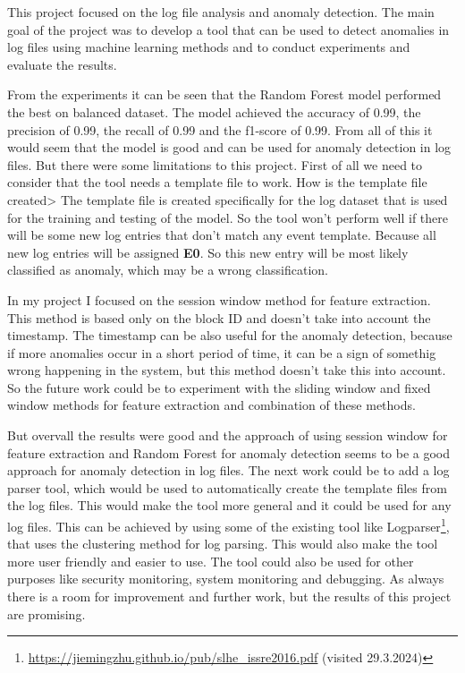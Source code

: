 This project focused on the log file analysis and anomaly detection.
The main goal of the project was to develop a tool that can be used to detect anomalies in log files using machine learning methods and to conduct experiments and evaluate the results.

From the experiments it can be seen that the Random Forest model performed the best on balanced dataset. The model achieved the accuracy of 0.99, the precision of 0.99, the recall of 0.99 and the f1-score of 0.99.
From all of this it would seem that the model is good and can be used for anomaly detection in log files. But there were some limitations to this project. 
First of all we need to consider that the tool needs a template file to work. How is the template file created> The template file is created specifically for the log dataset that is used for the training and testing of the model.
So the tool won't perform well if there will be some new log entries that don't match any event template. Because all new log entries will be assigned \textbf{E0}. So this new entry will be most likely classified as anomaly, which 
may be a wrong classification.

In my project I focused on the session window method for feature extraction. This method is based only on the block ID and doesn't take into account the timestamp. 
The timestamp can be also useful for the anomaly detection, because if more anomalies occur in a short period of time, it can be a sign of somethig wrong happening in the system, but this method doesn't take this into account. 
So the future work could be to experiment with the sliding window and fixed window methods for feature extraction and combination of these methods.

But overvall the results were good and the approach of using session window for feature extraction and Random Forest for anomaly detection seems to be a good approach for anomaly detection in log files.
The next work could be to add a log parser tool, which would be used to automatically create the template files from the log files. This would make the tool more general and it could be used for any log files.
This can be achieved by using some of the existing tool like Logparser\footnote{\url{https://jiemingzhu.github.io/pub/slhe_issre2016.pdf} (visited 29.3.2024)}, that uses the clustering method for log parsing.
This would also make the tool more user friendly and easier to use. The tool could also be used for other purposes like security monitoring, system monitoring and debugging. As always there is a room for 
improvement and further work, but the results of this project are promising.


% 
